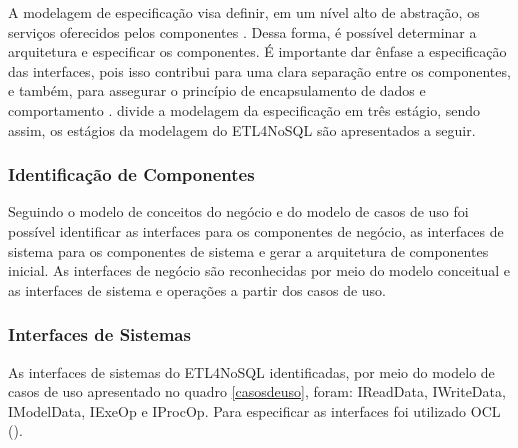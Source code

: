 A modelagem de especificação visa definir, em um nível alto de abstração, os serviços oferecidos pelos componentes \cite{itana:2005}. Dessa forma, é possível determinar a arquitetura e especificar os componentes. É importante dar ênfase a especificação das interfaces, pois isso contribui para uma clara separação entre os componentes, e também, para assegurar o princípio de encapsulamento de dados e comportamento \cite{itana:2005}. \cite{cheesman:2001} divide a modelagem da especificação em três estágio, sendo assim, os estágios da modelagem do ETL4NoSQL são apresentados a seguir.


\subsubsection{Identificação de Componentes}
Seguindo o modelo de conceitos do negócio e do modelo de casos de uso foi possível identificar as interfaces para os componentes de negócio, as interfaces de sistema para os componentes de sistema e gerar a arquitetura de componentes inicial. As interfaces de negócio são reconhecidas por meio do modelo conceitual e as interfaces de sistema e operações a partir dos casos de uso.

\subsubsection{Interfaces de Sistemas}

As interfaces de sistemas do ETL4NoSQL identificadas, por meio do modelo de casos de uso apresentado no quadro \ref{casosdeuso}, foram: IReadData, IWriteData, IModelData, IExeOp e IProcOp. Para especificar as interfaces foi utilizado OCL (\cite{warmer:1998}).


